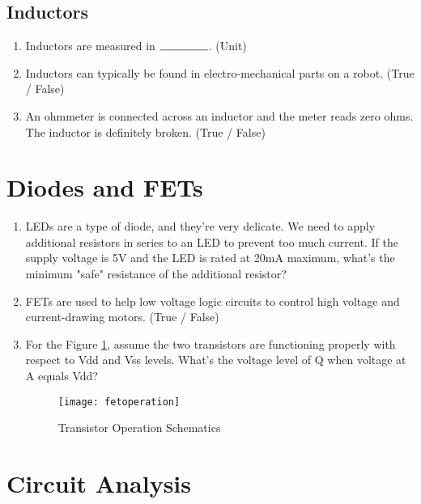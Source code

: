 \documentclass{article}
\newcommand{\ans}{$\rule{1.5cm}{0.15mm}$}
\begin{document}
\subsection{Inductors}
\begin{enumerate}
	\item Inductors are measured in \ans. (Unit)
	\item Inductors can typically be found in electro-mechanical parts on a robot. (True / False)
	\item An ohmmeter is connected across an inductor and the meter reads zero ohms. The inductor is definitely broken. (True / False)
\end{enumerate}

\section{Diodes and FETs}
\begin{enumerate}
	\item LEDs are a type of diode, and they're very delicate. We need to apply additional resistors in series to an LED to prevent too much current. If the supply voltage is 5V and the LED is rated at 20mA maximum, what's the minimum "safe" resistance of the additional resistor?
	\item FETs are used to help low voltage logic circuits to control high voltage and current-drawing motors. (True / False)
	\item For the Figure \ref{fig:transistor}, assume the two transistors are functioning properly with respect to Vdd and Vss levels. What's the voltage level of Q when voltage at A equals Vdd?

	\begin{figure}[!h]
		\center
		\texttt{[image: fetoperation]}
		\caption{Transistor Operation Schematics}
		\label{fig:transistor}
	\end{figure}
\end{enumerate}
\clearpage
\section{Circuit Analysis}
\end{document}
